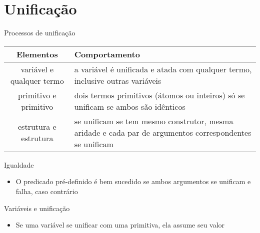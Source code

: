 \section{Unificação}

\begin{frame}[fragile]{Processos de unificação}

    \begin{table}
        \centering

        \begin{tabularx}{0.9\textwidth}{cX}
            \toprule
            \textbf{Elementos} & \textbf{Comportamento} \\            
            \midrule

            variável e qualquer termo & a variável é unificada e atada com qualquer termo, 
                inclusive outras variáveis \\
            \midrule

            primitivo e primitivo & dois termos primitivos (átomos ou inteiros) só se unificam 
                se ambos são idênticos \\
            \midrule

            estrutura e estrutura & se unificam se tem mesmo construtor, mesma aridade e cada 
                par de argumentos correspondentes se unificam \\
            \bottomrule
        \end{tabularx}
    \end{table}

\end{frame}

\begin{frame}[fragile]{Igualdade}

    \begin{itemize}
        \item O predicado pré-definido  é bem sucedido se ambos argumentos 
            se unificam e falha, caso contrário


    \end{itemize}

\end{frame}

\begin{frame}[fragile]{Variáveis e unificação}

    \begin{itemize}
        \item Se uma variável se unificar com uma primitiva, ela assume seu valor


    \end{itemize}

\end{frame}

